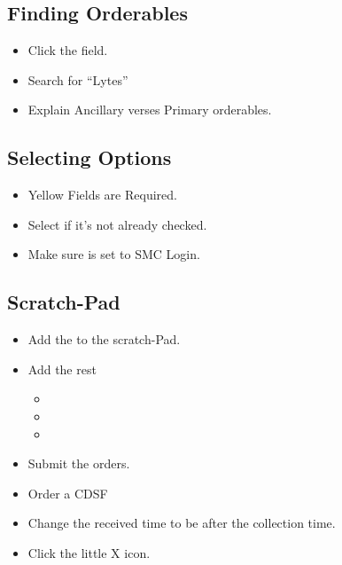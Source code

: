 
    \subsection{Finding Orderables}
        \begin{itemize}
            \item Click the  field.
            \item Search for ``Lytes''
            \item Explain Ancillary verses Primary orderables.
        \end{itemize}

    \subsection{Selecting Options}
        \begin{itemize}
            \item Yellow Fields are Required.
            \item Select  if it's not already checked.
            \item Make sure  is set to SMC Login. 
        \end{itemize}


    \subsection{Scratch-Pad}
        \begin{itemize}
            \item Add the  to the scratch-Pad.
            \item Add the rest
            \begin{itemize}
                \item {}
                \item {}
                \item {}
            \end{itemize}
            \item Submit the orders.
            \item Order a CDSF
            \item Change the received time to be after the collection time.
            \item Click the little X icon.
        \end{itemize}



